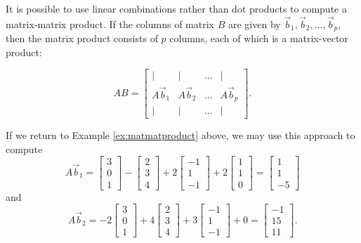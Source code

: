 \documentclass{ximera}
\begin{document}
\begin{remark}
It is possible to use linear combinations rather than dot products to compute a matrix-matrix product.  If the columns of matrix $B$ are given by ${\vec{b}_1, \vec{b}_2, ..., \vec{b}_p}$, then the matrix product consists of $p$ columns, each of which is a matrix-vector product:

$$AB = \begin{bmatrix} | & | & \dots & |\\
A\vec{b}_1 & A\vec{b}_2 & \dots & A\vec{b}_p\\
| & | & \dots & |
\end{bmatrix}.
$$

If we return to Example \ref{ex:matmatproduct} above, we may use this approach to compute
$$A\vec{b}_1=\begin{bmatrix}3\\0\\1\end{bmatrix}
-\begin{bmatrix}2\\3\\4\end{bmatrix}
+2\begin{bmatrix}-1\\1\\-1\end{bmatrix}
+2\begin{bmatrix}1\\1\\0\end{bmatrix} 
= \begin{bmatrix}1\\1\\-5\end{bmatrix}$$
and 
$$A\vec{b}_2=-2\begin{bmatrix}3\\0\\1\end{bmatrix}
+4\begin{bmatrix}2\\3\\4\end{bmatrix}
+3\begin{bmatrix}-1\\1\\-1\end{bmatrix}+0 = \begin{bmatrix}-1\\15\\11\end{bmatrix}.
$$

\end{remark}
\end{document}
